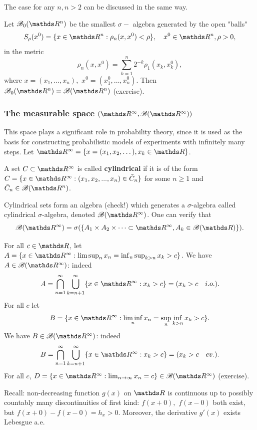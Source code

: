 The case for any $n, n >2$ can be discussed in the same way.
\begin{remark}
Let $\B_0 (\R^n)$ be the smallest $\sigma-$ algebra generated by the open "balls"
\begin{equation*}
    S_\rho (x^0) = \{ x \in \R^n: \rho_n (x, x^0) < \rho \}, \quad x^0 \in \R^n, \rho > 0,
\end{equation*}
in the metric 
\begin{equation*}
    \rho_n (x,x^0) = \sum_{k=1}^n 2^{-k} \rho_1(x_k, x_k^0),
\end{equation*}
where $x = (x_1, \dots, x_n),$ $x^0 = (x_1^0, \dots, x_n^0).$ Then $\B_0(\R^n) = \B(\R^n)$ (exercise).
\end{remark}

\subsubsection{The measurable space $(\R^\infty, \B(\R^\infty))$}
This space plays a significant role in probability theory, since it is used as the basis for constructing probabilistic models of experiments with infinitely many steps. Let $\R^\infty = \{  x = (x_1, x_2, \dots ), x_k \in \R \}$.
\begin{definition}
A set $C \subset \R^\infty$ is called \textbf{cylindrical} if it is of the form $C = \{ x \in \R^\infty :(x_1, x_2, ..., x_n) \in \tilde{C}_n \}$ for some $n \ge 1$ and $\tilde{C}_n \in \B(\R^n)$.
\end{definition}
Cylindrical sets form an algebra (check!) which generates a $\sigma$-algebra called cylindrical $\sigma$-algebra, denoted $\B(\R^\infty)$. One can verify that
\begin{equation*}
    \B(\R^\infty) = \sigma(\{ A_1 \times A_2 \times \cdots \subset \R^\infty, A_k \in \B(\R) \}).
\end{equation*}
\begin{example}
For all $c \in \R$, let $A = \{ x \in \R^\infty : \limsup_n x_n = \inf_n \sup_{k>n} x_k > c \}$. We have $A \in \B(\R^\infty)$: indeed
\begin{equation*}
    A = \bigcap_{n=1}^\infty \bigcup_{k = n+1}^\infty \{ x \in \R^\infty: x_k > c \} = (x_k > c \quad i.o.).
\end{equation*}
For all $c$ let 
\begin{equation*}
    B = \{ x \in \R^\infty: \liminf_n x_n = \sup_n \inf_{k>n} x_k > c \}.
\end{equation*}
We have $B \in \B(\R^\infty)$: indeed
\begin{equation*}
    B = \bigcap_{n=1}^\infty \bigcup_{k = n+1}^\infty \{ x \in \R^\infty: x_k > c \} = (x_k > c \quad ev.).
\end{equation*}
For all $c$, $D = \{ x\in \R^\infty : \lim_{n \rightarrow \infty} x_n = c \} \in \B(\R^\infty)$ (exercise).
\end{example}
Recall: non-decreasing function $g(x)$ on $\R$ is continuous up to possibly countably many discontinuities of first kind: $f(x+0),$ $f(x-0)$ both exist, but $f(x+0)-f(x-0) = h_x>0$. Moreover, the derivative $g'(x)$ exists Lebesgue a.e.


